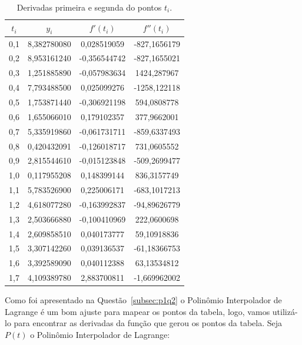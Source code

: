 \documentclass[12pt]{article}
\begin{document}
\begin{table}[H]
	\centering
	\begin{tabular}{|c|c|c|c|}
		\hline
		$t_{i}$ & $y_{i}$ & $f'(t_{i})$ & $f''(t_{i})$  \\\hline
		0,1 & 8,382780080 & 0,028519059 &	-827,1656179 \\\hline
		0,2 & 8,953161240 & -0,356544742 & -827,1655021 \\\hline
		0,3 & 1,251885890 & -0,057983634 & 1424,287967\\\hline
		0,4 & 7,793488500 & 0,025099276 & -1258,122118\\\hline
		0,5 & 1,753871440 & -0,306921198 & 594,0808778\\\hline
		0,6 & 1,655066010 & 0,179102357 & 377,9662001\\\hline
		0,7 & 5,335919860 & -0,061731711 & -859,6337493\\\hline
		0,8 & 0,420432091 & -0,126018717 & 731,0605552\\\hline
		0,9 & 2,815544610 & -0,015123848 & -509,2699477\\\hline
		1,0 & 0,117955208 & 0,148399144 & 836,3157749\\\hline
		1,1 & 5,783526900 & 0,225006171 & -683,1017213\\\hline
		1,2 & 4,618077280 & -0,163992837 & -94,89626779\\\hline
		1,3 & 2,503666880 & -0,100410969 & 222,0600698\\\hline
		1,4 & 2,609858510 & 0,040173777 & 59,10918836\\\hline
		1,5 & 3,307142260 & 0,039136537 & -61,18366753\\\hline
		1,6 & 3,392589090 & 0,040112388 & 63,13534812\\\hline
		1,7 & 4,109389780 & 2,883700811 & -1,669962002\\\hline
	\end{tabular}
	\caption{Derivadas primeira e segunda do pontos $t_{i}$.}
	\label{tab:ti}
\end{table}

Como foi apresentado na Questão~\ref{subsec:p1q2} o Polinômio Interpolador de Lagrange é um bom ajuste para mapear os pontos da tabela, logo, vamos utilizá-lo para encontrar as derivadas da função que gerou os pontos da tabela. Seja $P(t)$ o Polinômio Interpolador de Lagrange:
\end{document}
